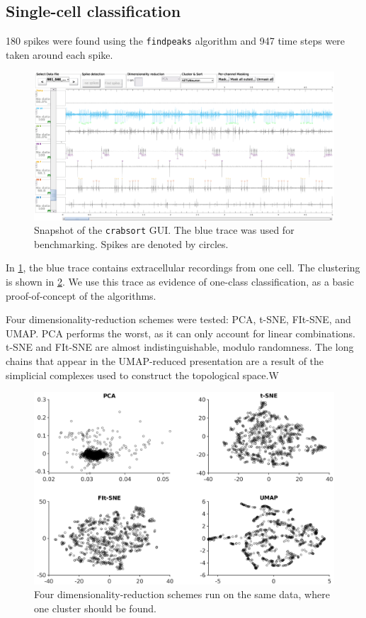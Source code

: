 \documentclass{article}
\begin{document}
\subsection{Single-cell classification}

180 spikes were found using the \texttt{findpeaks} algorithm
and 947 time steps were taken around each spike.

\begin{figure}
  \centering
  \includegraphics[width=\textwidth]{gfx/crabsort-1.eps}
  \caption{Snapshot of the \texttt{crabsort} GUI. The blue trace was used for benchmarking. Spikes are denoted by circles.}
  \label{fig:crabsort-1}
\end{figure}

In \ref{fig:crabsort-1}, the blue trace contains extracellular recordings from one cell.
The clustering is shown in \ref{fig:dim-red-comparison-1}.
We use this trace as evidence of one-class classification,
as a basic proof-of-concept of the algorithms.

Four dimensionality-reduction schemes were tested: PCA, t-SNE, FIt-SNE, and UMAP.
PCA performs the worst, as it can only account for linear combinations.
t-SNE and FIt-SNE are almost indistinguishable, modulo randomness.
The long chains that appear in the UMAP-reduced presentation are a result of
the simplicial complexes used to construct the topological space.W

\begin{figure}
  \centering
  \includegraphics[width=\textwidth]{gfx/dim-red-1.eps}
  \caption{Four dimensionality-reduction schemes run on the same data, where one cluster should be found.}
  \label{fig:dim-red-comparison-1}
\end{figure}
\end{document}
